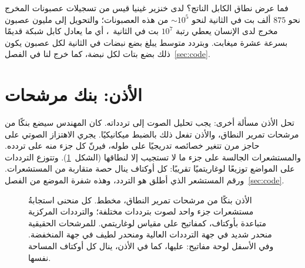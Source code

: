 فما عرض نطاق الكابل الناتج؟ لدى خنزير غينيا قيس من تسجيلات عصبونات المخرج نحو $875$ ألف بت في الثانية لنحو $\sim10^5$ من هذه العصبونات؛ والتحويل إلى مليون عصبون مخرج لدى الإنسان يعطي رتبة $10^7$ بت في الثانية~\cite{Koch2006}، أي ما يعادل كابل شبكة قديمًا بسرعة عشرة ميغابت. وبتردد متوسط يبلغ بضع نبضات في الثانية لكل عصبون يكون ذلك بضع بتات لكل نبضة، كما خرج لنا في الفصل~\ref{sec:code}.

\section{الأذن: بنك مرشحات}

تحل الأذن مسألة أخرى: يجب تحليل الصوت إلى تردداته. كان المهندس سيضع بنكًا من مرشحات تمرير النطاق، والأذن تفعل ذلك بالضبط ميكانيكيًا. يجري الاهتزاز الصوتي على حاجز مرن تتغير خصائصه تدريجيًا على طوله، فيرنّ كل جزء منه على تردده. والمستشعرات الجالسة على جزء ما لا تستجيب إلا لنطاقها (الشكل~\ref{fig:filterbank}). وتتوزع الترددات على المواضع توزيعًا لوغاريتميًا تقريبًا: كل أوكتاف ينال حصة متقاربة من المستشعرات. ورقم المستشعر الذي أطلق هو التردد، وهذه شفرة الموضع من الفصل~\ref{sec:code}.

\begin{figure}[t]
\centering
{}
\caption{الأذن بنكًا من مرشحات تمرير النطاق، مخطط. كل منحنى استجابةُ مستشعرات جزء واحد لصوت بترددات مختلفة؛ والترددات المركزية متباعدة بأوكتاف، كمفاتيح على مقياس لوغاريتمي. للمرشحات الحقيقية منحدر شديد في جهة الترددات العالية ومنحدر لطيف في جهة المنخفضة. وفي الأسفل لوحة مفاتيح: عليها، كما في الأذن، ينال كل أوكتاف المساحة نفسها.}
\label{fig:filterbank}
\end{figure}

